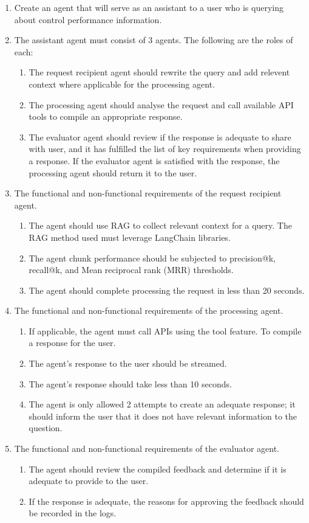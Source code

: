 \documentclass{article}
\begin{document}
\begin{enumerate}
    \item Create an agent that will serve as an assistant to a user who is querying about control performance information. 
    \item The assistant agent must consist of 3 agents. The following are the roles of each:
    \begin{enumerate}
        \item The request recipient agent should rewrite the query and add relevent context where applicable for the processing agent.
        \item The processing agent should analyse the request and call available API tools to compile an appropriate response.
        \item The evaluator agent should review if the response is adequate to share with user, and it has fulfilled the list of key requirements when providing a response. If the evaluator agent is satisfied with the response, the processing agent should return it to the user.
    \end{enumerate}
    \item The functional and non-functional requirements of the request recipient agent.
    \begin{enumerate}
        \item The agent should use RAG to collect relevant context for a query. The RAG method used must leverage LangChain libraries.
        \item The agent chunk performance should be subjected to precision@k, recall@k, and Mean reciprocal rank (MRR) thresholds.
        \item The agent should complete processing the request in less than 20 seconds.
    \end{enumerate}
    \item The functional and non-functional requirements of the processing agent.
    \begin{enumerate}
        \item If applicable, the agent must call APIs using the tool feature. To compile a response for the user.
        \item The agent's response to the user should be streamed.
        \item The agent's response should take less than 10 seconds.
        \item The agent is only allowed 2 attempts to create an adequate response; it should inform the user that it does not have relevant information to the question.
    \end{enumerate}
    \item The functional and non-functional requirements of the evaluator agent.
    \begin{enumerate}
        \item The agent should review the compiled feedback and determine if it is adequate to provide to the user.
        \item If the response is adequate, the reasons for approving the feedback should be recorded in the logs.
    \end{enumerate}


\end{enumerate}
\end{document}
